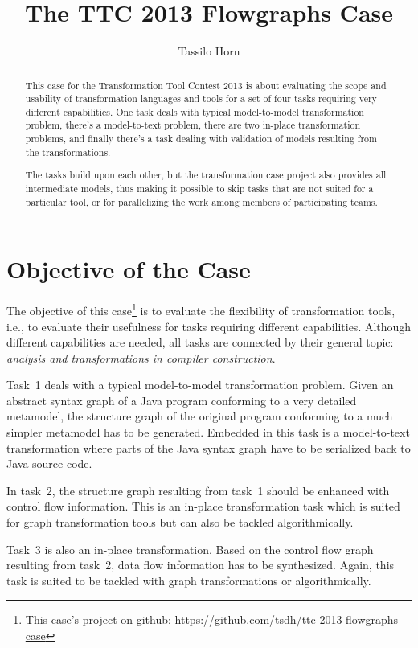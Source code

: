 \documentclass[submission]{eptcs}
\title{The TTC 2013 Flowgraphs Case}
\author{Tassilo Horn
  \email{\myemail}
  \institute{University Koblenz-Landau, Institute for Software Technology, Germany}}
\begin{document}
\maketitle

\begin{abstract}
  This case for the Transformation Tool Contest 2013 is about evaluating the
  scope and usability of transformation languages and tools for a set of four
  tasks requiring very different capabilities.  One task deals with typical
  model-to-model transformation problem, there's a model-to-text problem, there
  are two in-place transformation problems, and finally there's a task dealing
  with validation of models resulting from the transformations.

  The tasks build upon each other, but the transformation case project also
  provides all intermediate models, thus making it possible to skip tasks that
  are not suited for a particular tool, or for parallelizing the work among
  members of participating teams.
\end{abstract}


\section{Objective of the Case}
\label{sec:objective}

The objective of this case\footnote{This case's project on github:
  \url{https://github.com/tsdh/ttc-2013-flowgraphs-case}} is to evaluate the
flexibility of transformation tools, i.e., to evaluate their usefulness for
tasks requiring different capabilities.  Although different capabilities are
needed, all tasks are connected by their general topic: \emph{analysis and
  transformations in compiler construction}.

Task~1 deals with a typical model-to-model transformation problem.  Given an
abstract syntax graph of a Java program conforming to a very detailed
metamodel, the structure graph of the original program conforming to a much
simpler metamodel has to be generated.  Embedded in this task is a
model-to-text transformation where parts of the Java syntax graph have to be
serialized back to Java source code.

In task~2, the structure graph resulting from task~1 should be enhanced with
control flow information.  This is an in-place transformation task which is
suited for graph transformation tools but can also be tackled algorithmically.

Task~3 is also an in-place transformation.  Based on the control flow graph
resulting from task~2, data flow information has to be synthesized.  Again,
this task is suited to be tackled with graph transformations or
algorithmically.
\end{document}
